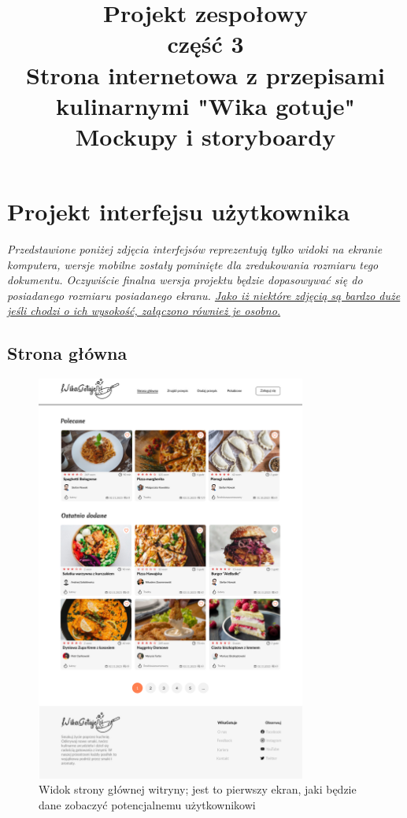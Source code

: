 \documentclass{article}
\title{\fontsize{20}{22}\selectfont Projekt zespołowy\\ część 3\\Strona internetowa z przepisami kulinarnymi "Wika gotuje"\\Mockupy i storyboardy}
\date{}
\begin{document}
\maketitle
\newpage

\section{Projekt interfejsu użytkownika}
\textit{Przedstawione poniżej zdjęcia interfejsów reprezentują tylko widoki na ekranie komputera, wersje mobilne zostały pominięte dla zredukowania rozmiaru tego dokumentu. Oczywiście
finalna wersja projektu będzie dopasowywać się do posiadanego rozmiaru posiadanego ekranu. \underline{Jako iż niektóre zdjęcią są bardzo duże jeśli chodzi o ich wysokość, załączono
również je osobno.}}

\subsection{Strona główna}
\begin{figure}[H]
    \begin{center}
        \includegraphics[width=0.79\textwidth]{mockups/main_page}
    \end{center}
    \caption{Widok strony głównej witryny; jest to pierwszy ekran, jaki będzie dane zobaczyć potencjalnemu użytkownikowi}
    \label{fig:main_page}
\end{figure}
    
\end{document}
